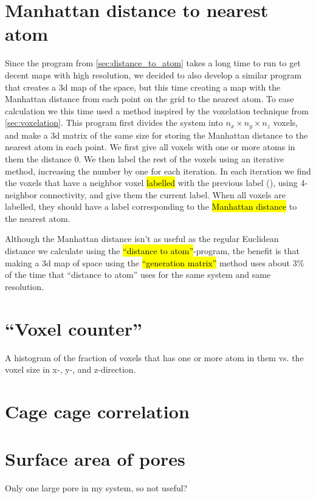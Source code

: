 \section{Manhattan distance to nearest atom\label{sec:generation_matrix}}
Since the program from \cref{sec:distance_to_atom} takes a long time to run to get decent maps with high resolution, we decided to also develop a similar program that creates a 3d map of the space, but this time creating a map with the Manhattan distance from each point on the grid to the nearest atom. To ease calculation we this time used a method inspired by the voxelation technique from \cref{sec:voxelation}. This program first divides the system into $n_x\times n_y\times n_z$ voxels, and make a 3d matrix of the same size for storing the Manhattan distance to the nearest atom in each point. We first give all voxels with one or more atoms in them the distance 0. We then label the rest of the voxels using an iterative method, increasing the number by one for each iteration. In each iteration we find the voxels that have a neighbor voxel \hl{labelled} with the previous label (), using 4-neighbor connectivity, and give them the current label. When all voxels are labelled, they should have a label corresponding to the \hl{Manhattan distance} to the nearest atom.

Although the Manhattan distance isn't as useful as the regular Euclidean distance we calculate using the \hl{``distance to atom''}-program, the benefit is that making a 3d map of space using the \hl{``generation matrix''} method uses about 3\% of the time that ``distance to atom'' uses for the same system and same resolution. 



\section{``Voxel counter''}
    A histogram of the fraction of voxels that has one or more atom in them vs. the voxel size in x-, y-, and z-direction.
    
\section{Cage cage correlation}

\section{Surface area of pores}
    Only one large pore in my system, so not useful?
